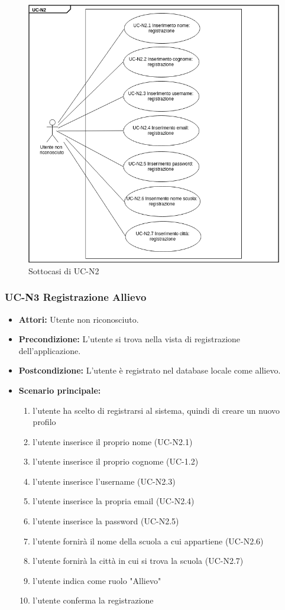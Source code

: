 \begin{figure}[htbp]
	\centering
	\includegraphics[scale=0.7]{images/UC-N2sub.png}
	\caption{Sottocasi di UC-N2}
\end{figure}


\subsubsection{UC-N3 Registrazione Allievo}
\begin{itemize}
	\item \textbf{Attori: }Utente non riconosciuto.
	\item \textbf{Precondizione: }L'utente si trova nella vista di registrazione dell'applicazione.
	\item \textbf{Postcondizione: }L'utente è registrato nel database locale come allievo.
	\item \textbf{Scenario principale: }
		\begin{enumerate}
		\item l'utente ha scelto di registrarsi al sistema, quindi di creare un nuovo profilo
		\item l'utente inserisce il proprio nome (UC-N2.1)
		\item l'utente inserisce il proprio cognome (UC-1.2)
		\item l'utente inserisce l'username (UC-N2.3)
		\item l'utente inserisce la propria email (UC-N2.4)
		\item l'utente inserisce la password (UC-N2.5)
		\item l'utente fornirà il nome della scuola a cui appartiene (UC-N2.6)
		\item l'utente fornirà la città in cui si trova la scuola (UC-N2.7)
		\item l'utente indica come ruolo "Allievo"
		\item l'utente conferma la registrazione
		\end{enumerate}
\end{itemize}

